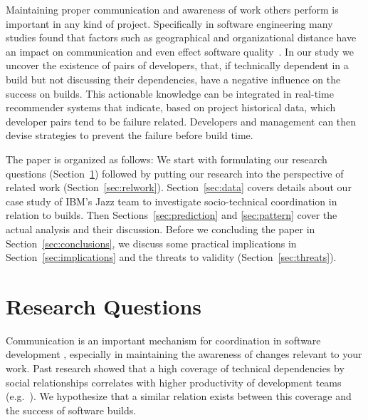 \documentclass[12pt,oneside]{book}
\begin{document}
Maintaining proper communication and awareness of work others perform is
important in any kind of project. Specifically in software engineering many studies found
that factors such as geographical and organizational distance have an impact on
communication and even effect software quality~\cite{nagappan:icse:2008}. In our
study we uncover the existence of pairs of
developers, that, if technically dependent in a build but not discussing their
dependencies, have a negative influence on the success on builds. This
actionable knowledge can be integrated in real-time recommender systems that
indicate, based on project historical data, which developer pairs tend to be
failure related. Developers and management can then devise strategies to
prevent the failure before build time. 


The paper is organized as follows: We start with formulating our research
questions (Section~\ref{sec:rq}) followed by putting our research into the
perspective of related work (Section~\ref{sec:relwork}). Section~\ref{sec:data}
covers details about our case study of IBM's Jazz team to investigate
socio-technical coordination in relation to builds. Then
Sections~\ref{sec:prediction} and \ref{sec:pattern} cover the actual analysis and
their discussion. Before we concluding the paper in
Section~\ref{sec:conclusions}, we discuss some practical implications in Section~\ref{sec:implications} and the threats to validity
(Section~\ref{sec:threats}).




\section{Research Questions}
\label{sec:rq}
Communication
is an important mechanism for coordination in software development \cite{curtis:acm:1988,kraut:1995coordination}, especially in maintaining the awareness of changes relevant to your work. Past research showed that a high coverage of technical
dependencies by social relationships correlates with higher productivity of development teams (e.g.~\cite{cataldo:cscw:2006}). 
 We hypothesize that a similar relation
exists between this coverage and the success of software builds. 
\end{document}
